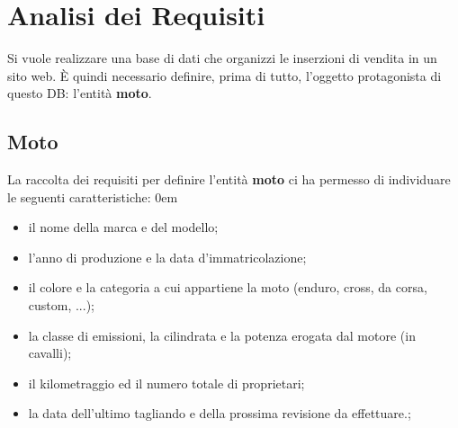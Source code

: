 \section{Analisi dei Requisiti}
	Si vuole realizzare una base di dati che organizzi le inserzioni di vendita in un sito web. \`{E} quindi necessario definire, prima di tutto, l'oggetto protagonista di questo DB: l'entit\`{a} \textbf{moto}. 		\subsection{Moto}	
		La raccolta dei requisiti per definire l'entit\`{a} \textbf{moto} ci ha permesso di individuare le seguenti caratteristiche:
	\openup 0em
	\begin{itemize}
	\setlength\itemsep{0em}
		\item il nome della marca e del modello;
		\item l'anno di produzione e la data d'immatricolazione;
 		\item il colore e la categoria a cui appartiene la moto (enduro, cross, da corsa, custom, ...);
  		\item la classe di emissioni, la cilindrata e la potenza erogata dal motore (in cavalli);
  		\item il kilometraggio ed il numero totale di proprietari;
  		\item la data dell'ultimo tagliando e della prossima revisione da effettuare.;
	\end{itemize}
  		